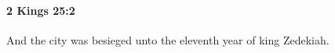 
		\paragraph{2 Kings 25:2} %
			\label{2KINGS-25-2}

			And the city was besieged unto the eleventh year of king Zedekiah.



